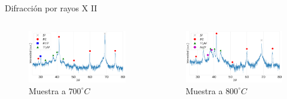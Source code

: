 \documentclass[11pt]{beamer}
\begin{document}
			\begin{frame}{Difracción por rayos X II}
			\begin{columns}
				\begin{column}{.49\textwidth}
					\begin{figure}
						\includegraphics[scale=0.1]{img/RX/NiPoor_700.png}
						\caption*{Muestra a $700 ^\circ C$}
					\end{figure}
				\end{column}
				\begin{column}{.49\textwidth}
					\begin{figure}
						\includegraphics[scale=0.1]{img/RX/NiPoor_800.png}
						\caption*{Muestra a $800 ^\circ C$}
					\end{figure}
				\end{column}
			\end{columns}
			\end{frame}
			
\end{document}
